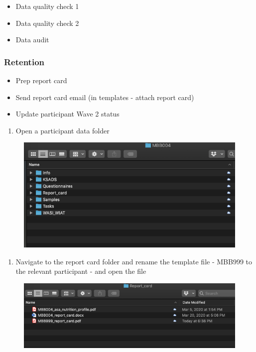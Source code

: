 \documentclass[]{book}
\providecommand{\tightlist}{%
  \setlength{\itemsep}{0pt}\setlength{\parskip}{0pt}}
\begin{document}
\begin{itemize}
\tightlist
\item
  Data quality check 1
\item
  Data quality check 2
\item
  Data audit
\end{itemize}

\hypertarget{retention}{%
\subsubsection{Retention}\label{retention}}

\begin{itemize}
\tightlist
\item
  Prep report card
\item
  Send report card email (in templates - attach report card)
\item
  Update participant Wave 2 status
\end{itemize}

\begin{enumerate}
\def\labelenumi{\arabic{enumi}.}
\tightlist
\item
  Open a participant data folder
\end{enumerate}

\begin{figure}
\centering
\includegraphics{images/final_checklist/report_cards/1.png}
\caption{}
\end{figure}

\begin{enumerate}
\def\labelenumi{\arabic{enumi}.}
\setcounter{enumi}{1}
\tightlist
\item
  Navigate to the report card folder and rename the template file - MBB999 to the relevant participant - and open the file
\end{enumerate}

\begin{figure}
\centering
\includegraphics{images/final_checklist/report_cards/2.png}
\caption{}
\end{figure}
\end{document}
